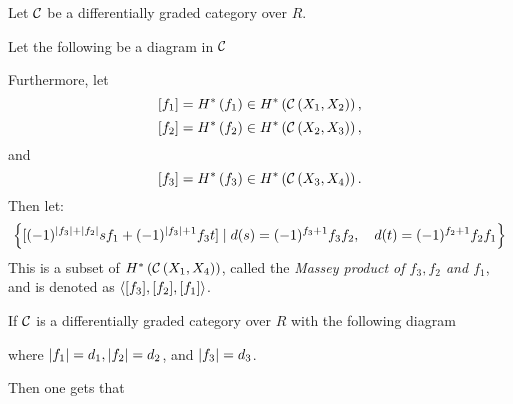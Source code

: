 \begin{definition}
    Let \( {\mathcal{C}} \) be a differentially graded category over \( R \).

    Let the following be a diagram in \( {\mathcal{C}} \)
    \begin{center}
    \end{center}

    Furthermore, let
    \[
        [f_1] = H^* \left( f_1 \right) \in H^* \left( {\mathcal{C}} \left( X_1, X_2 \right) \right),
    \]
    \[
        [f_2] = H^* \left( f_2 \right) \in H^* \left( {\mathcal{C}} \left( X_2, X_3 \right) \right),
    \]
    and
    \[
        [f_3] = H^* \left( f_3 \right) \in H^* \left( {\mathcal{C}} \left( X_3, X_4 \right) \right).
    \]
    Then let:
    \[
        \left\{ 
            [(-1)^{\lvert f_3 \rvert + \lvert f_2 \rvert}s f_1 + (-1)^{\lvert f_3 \rvert + 1} f_3 t]
            \mid
            d(s) = (-1)^{f_3 + 1} f_3 f_2, \quad
            d(t) = (-1)^{f_2 + 1} f_2 f_1
         \right\}
    \]
    This is a subset of \( H^* \left( {\mathcal{C}} \left( X_1, X_4 \right) \right) \), called the \emph{Massey product of \( f_3, f_2 \) and \( f_1 \)}, and is denoted as \( \langle [f_3], [f_2], [f_1] \rangle \).
\end{definition}

\begin{remark}
    If \( {\mathcal{C}} \) is a differentially graded category over \( R \) with the following diagram
    \begin{center}
    \end{center}
    where \( \lvert f_1 \rvert = d_1, \lvert f_2 \rvert = d_2 \), and \( \lvert f_3 \rvert = d_3 \).

    Then one gets that
    
\end{remark}